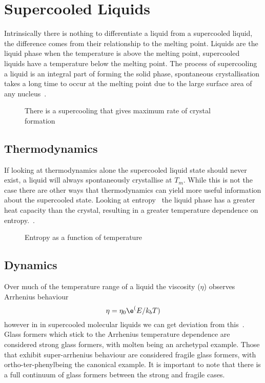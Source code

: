 

\section{Supercooled Liquids}

Intrinsically there is nothing to differentiate a liquid from a supercooled liquid, the difference comes from their relationship to the melting point. Liquids are the liquid phase when the temperature is above the melting point, supercooled liquids have a temperature below the melting point. The process of supercooling a liquid is an integral part of forming the solid phase, spontaneous crystallisation takes a long time to occur at the melting point due to the large surface area of any nucleus~.

\begin{figure}
    \caption{There is a supercooling that gives maximum rate of crystal formation}
    \label{fig:supercool crys}
\end{figure}


\subsection{Thermodynamics}

If looking at thermodynamics alone the supercooled liquid state should never exist, a liquid will always spontaneously crystallise at $T_m$. While this is not the case there are other ways that thermodynamics can yield more useful information about the supercooled state. Looking at entropy~ the liquid phase has a greater heat capacity than the crystal, resulting in a greater temperature dependence on entropy.~\cite{debenedetti:01}.

\begin{figure}
    \caption{Entropy as a function of temperature}
    \label{fig:entropy}
\end{figure}

\subsection{Dynamics}

Over much of the temperature range of a liquid the viscosity ($\eta$) observes Arrhenius behaviour
\begin{equation}
    \eta = \eta_0 \e^(E/k_bT)
\end{equation}
however in in supercooled molecular liquids we can get deviation from this~. Glass formers which stick to the Arrhenius temperature dependence are considered strong glass formers, with molten  being an archetypal example. Those that exhibit super-arrhenius behaviour are considered fragile glass formers, with ortho-ter-phenyl\tocheck being the canonical example. It is important to note that there is a full continuum of glass formers between the strong and fragile cases.

